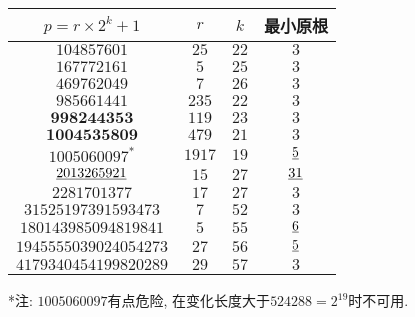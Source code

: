 \begin{tabular}{|c|c|c|c|}
	\hline $p = r \times 2 ^ k + 1$ &  $r$  & $k$  & 最小原根 \\
	\hline $104857601$              &  $25$ & $22$ & $3$ \\
	\hline $167772161$              &  $5$  & $25$ & $3$ \\
     \hline $469762049$      &  $7$   &  $26$  &    $3$ \\
     \hline $985661441$      & $235$  &  $22$  &    $3$ \\
  \hline $\mathbf{998244353}$    & $119$  &  $23$  &    $3$ \\
  \hline $\mathbf{1004535809}$    & $479$  &  $21$  &    $3$ \\
  \hline $1005060097 ^ *$      & $1917$ &  $19$  &  $\emph{5}$ \\
  \hline $\emph{2013265921}$    &  $15$  &  $27$  &  $\emph{31}$ \\
    \hline $2281701377$      &  $17$  &  $27$  &    $3$ \\
 \hline $31525197391593473$  &  $7$   &  $52$  &    $3$ \\
\hline $180143985094819841$  &  $5$   &  $55$  &  $\emph{6}$ \\
\hline $1945555039024054273$ &  $27$  &  $56$  &  $\emph{5}$ \\
\hline $4179340454199820289$ &  $29$  &  $57$  &    $3$ \\
\hline
\end{tabular}

*注: $1005060097$有点危险, 在变化长度大于$524288 = 2 ^ {19}$时不可用.
